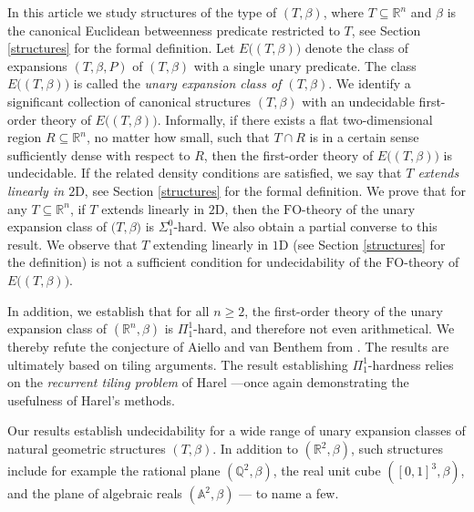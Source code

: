 \documentclass{LMCS}
\theoremstyle{plain}
\begin{document}
In this article we study structures of the type
of $(T,\beta)$, where $T\subseteq\mathbb{R}^n$ and $\beta$ is the
canonical Euclidean betweenness predicate restricted to $T$, see
Section \ref{structures} for the
formal definition.
%
Let $E\bigl((T,\beta)\bigr)$
denote the class of expansions $(T,\beta,P)$
of $(T,\beta)$ with a single unary predicate. The class $E\bigl((T,\beta)\bigr)$ is called
%
the \emph{unary expansion class of $(T,\beta)$}.
We identify a significant collection of canonical structures $(T,\beta)$
with an undecidable first-order theory of $E\bigl((T,\beta)\bigr)$.
%
Informally, if there exists a flat two-dimensional
region $R\subseteq\mathbb{R}^n$, no matter how small,
such that $T\cap R$ is in a certain sense sufficiently dense with respect to $R$, then the
first-order theory of $E\bigl((T,\beta)\bigr)$ is undecidable.
If the related density conditions are satisfied, we say that \emph{$T$ extends
linearly in $\mathrm{2D}$}, see Section \ref{structures} for the formal definition.
We prove that for any $T\subseteq\mathbb{R}^n$, if $T$ extends linearly in $\mathrm{2D}$,
then the $\mathrm{FO}$-theory of the unary expansion class of $(T,\beta\bigr)$ is $\Sigma^0_1$-hard. We also obtain a partial converse to
this result. We observe that $T$ extending linearly
in $\mathrm{1D}$ (see
Section \ref{structures} for the definition) is not a sufficient condition for undecidability of the $\mathrm{FO}$-theory of $E\bigl((T,\beta)\bigr)$.


In addition, we establish that for all $n\geq 2$,
the first-order theory of the unary expansion class of $(\mathbb{R}^n,\beta)$ is $\Pi_1^1$-hard,
and therefore not even arithmetical.
We thereby refute the conjecture
of Aiello and van Benthem from \cite{vanBenthemAiello:2002}.
The results are ultimately based on tiling arguments. The result establishing $\Pi_1^1$-hardness
relies on the \emph{recurrent tiling problem} of Harel \cite{Harel:1985}---once
again demonstrating the usefulness of Harel's methods.
%


%
Our results establish undecidability for a wide range of unary expansion classes of natural geometric
structures $(T,\beta)$.
In addition to $(\mathbb{R}^2,\beta)$, such
structures include for example the rational plane $(\mathbb{Q}^2,\beta)$,
the real unit cube $([0,1]^3,\beta)$, and the plane of
algebraic reals $(\mathbb{A}^2,\beta)$ --- to name a few.
%
\end{document}
